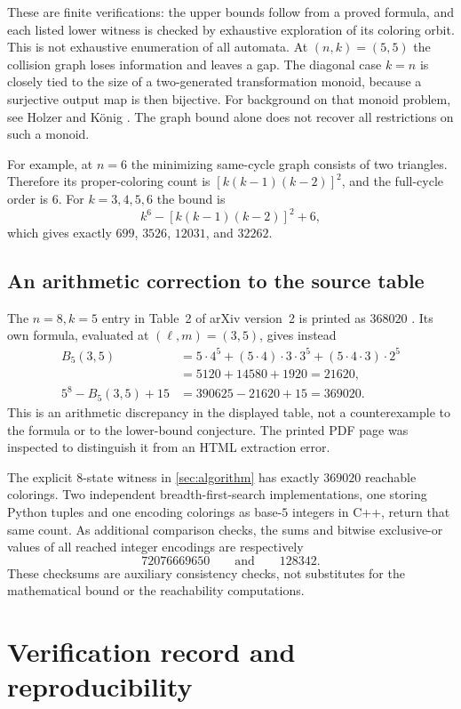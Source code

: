 \documentclass[11pt,a4paper]{article}
\numberwithin{equation}{section}
\theoremstyle{definition}
\theoremstyle{remark}
\begin{document}
These are finite verifications: the upper bounds follow from a proved
formula, and each listed lower witness is checked by exhaustive exploration
of its coloring orbit. This is not exhaustive enumeration of all automata.
At $(n,k)=(5,5)$ the collision graph loses information and leaves a gap.
The diagonal case $k=n$ is closely tied to the size of a two-generated
transformation monoid, because a surjective output map is then bijective.
For background on that monoid problem, see Holzer and K\"onig
\cite{HolzerKoenig2004}.
The graph bound alone does not recover all restrictions on such a monoid.

For example, at $n=6$ the minimizing same-cycle graph consists of two
triangles. Therefore its proper-coloring count is
$[k(k-1)(k-2)]^2$, and the full-cycle order is $6$. For $k=3,4,5,6$ the bound
is
\[
 k^6-[k(k-1)(k-2)]^2+6,
\]
which gives exactly $699$, $3526$, $12031$, and $32262$.

\subsection{An arithmetic correction to the source table}\label{sec:correction}

The $n=8,k=5$ entry in Table~2 of arXiv version~2 is printed as $368020$
\cite[p.~13]{Davies2017}. Its own formula, evaluated at $(\ell,m)=(3,5)$,
gives instead
\begin{align*}
 B_5(3,5)
 &=5\cdot4^5+(5\cdot4)\cdot3\cdot3^5
    +(5\cdot4\cdot3)\cdot2^5\\
 &=5120+14580+1920=21620,\\
 5^8-B_5(3,5)+15&=390625-21620+15=369020.
\end{align*}
This is an arithmetic discrepancy in the displayed table, not a
counterexample to the formula or to the lower-bound conjecture. The printed
PDF page was inspected to distinguish it from an HTML extraction error.

The explicit $8$-state witness in \cref{sec:algorithm} has exactly $369020$
reachable colorings. Two independent breadth-first-search implementations,
one storing Python tuples and one encoding colorings as base-$5$ integers in
C++, return that same count. As additional comparison checks, the sums and
bitwise exclusive-or values of all reached integer encodings are respectively
\[
 72076669650\qquad\text{and}\qquad128342.
\]
These checksums are auxiliary consistency checks, not substitutes for the
mathematical bound or the reachability computations.

\section{Verification record and reproducibility}\label{sec:verification}
\end{document}
